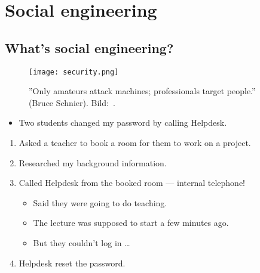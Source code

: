 


\section{Social engineering}

\subsection{What's social engineering?}

\begin{frame}
  \begin{figure}
    \texttt{[image: security.png]}
    \caption{''Only amateurs attack machines; professionals target people.'' 
    (Bruce Schnier).
    Bild:~\cite{xkcd538}.}
  \end{figure}
\end{frame}

\begin{frame}
  \begin{example}
    \begin{itemize}
      \item Two students changed my password by calling Helpdesk.
    \end{itemize}

    \pause

    \begin{enumerate}
      \item Asked a teacher to book a room for them to work on a project.
      \item Researched my background information.
      \item Called Helpdesk from the booked room --- internal telephone!
        \begin{itemize}
          \item Said they were going to do teaching.
          \item The lecture was supposed to start a few minutes ago.
          \item But they couldn't log in \dots
        \end{itemize}
      \item Helpdesk reset the password.
    \end{enumerate}
  \end{example}
\end{frame}

